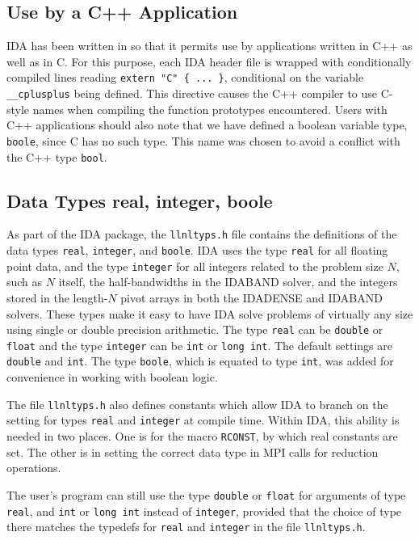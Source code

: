   
\subsection{Use by a C++ Application}

IDA has been written in so that it permits use by
applications written in C++ as well as in C.  For this purpose, each
IDA header file is wrapped with conditionally compiled lines reading
{\tt extern "C" \{ ... \}}, conditional on the variable 
{\tt \_\_cplusplus} being defined.  This directive causes the C++
compiler to use C-style names when compiling the function prototypes
encountered.  Users with C++ applications should also
note that we have defined a boolean variable type, 
{\tt boole}, since C has no such type.  This name was chosen to
avoid a conflict with the C++ type {\tt bool}.


\subsection{Data Types real, integer, boole}

As part of the IDA package, the {\tt llnltyps.h} file contains the
definitions of the data types {\tt real}, {\tt integer}, and {\tt boole}.
IDA uses the type {\tt real} for all floating point data, and the type
{\tt integer} for all integers related to the problem size $N$, such
as $N$ itself, the half-bandwidths in the IDABAND solver, and the
integers stored in the length-$N$ pivot arrays in both the IDADENSE
and IDABAND solvers.  These types make it easy to have IDA solve
problems of virtually any size using single or double precision
arithmetic.  The type {\tt real} can be {\tt double} or {\tt float}
and the type {\tt integer} can be {\tt int} or {\tt long int}. The
default settings are {\tt double} and {\tt int}.  The type 
{\tt boole}, which is equated to type {\tt int}, was added for
convenience in working with boolean logic.

The file {\tt llnltyps.h} also defines constants which allow IDA to
branch on the setting for types {\tt real} and {\tt integer} at
compile time.  Within IDA, this ability is needed in two places.  One
is for the macro {\tt RCONST}, by which real constants are set.  The
other is in setting the correct data type in MPI calls for reduction
operations.

The user's program can still use the type {\tt double} or {\tt float}
for arguments of type {\tt real}, and {\tt int} or {\tt long int}
instead of {\tt integer}, provided that the choice of type there
matches the typedefs for {\tt real} and {\tt integer} in the file 
{\tt llnltyps.h}.



